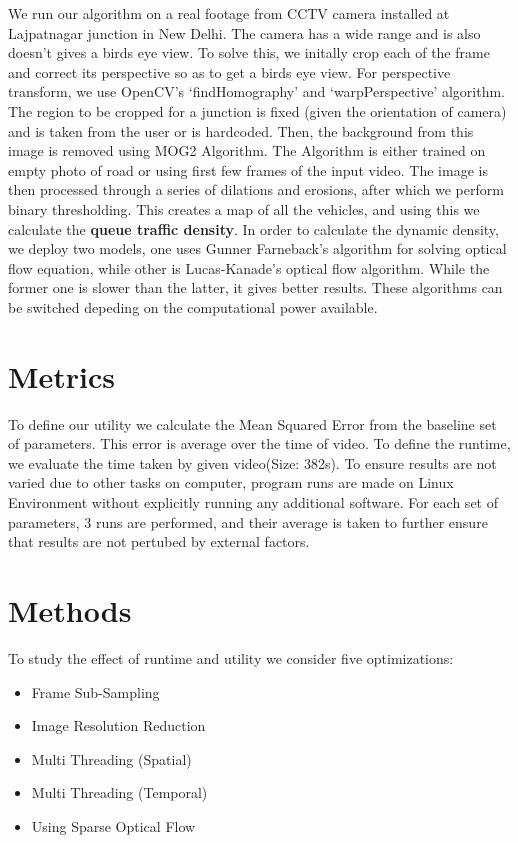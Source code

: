 \documentclass[conference]{IEEEtran}
\begin{document}
We run our algorithm on a real footage from CCTV camera installed at Lajpatnagar junction in New Delhi. \cite{b1}
The camera has a wide range and is also doesn't gives a birds eye view. To solve this, we initally crop each of the frame and correct its perspective so as to get a birds eye view. 
For perspective transform, we use OpenCV's `findHomography' and `warpPerspective' algorithm. \cite{b2}
The region to be cropped for a junction is fixed (given the orientation of camera) and is taken from the user or is hardcoded.
Then, the background from this image is removed using MOG2 Algorithm. The Algorithm is either trained on empty photo of road or using first few frames of the input video.
The image is then processed through a series of dilations and erosions, after which we perform binary thresholding. This creates a map of all the vehicles, and using this we calculate the {\bfseries{queue traffic density}}. 
In order to calculate the dynamic density, we deploy two models, one uses Gunner Farneback's algorithm for solving optical flow equation, while other is Lucas-Kanade's optical flow algorithm. \cite{b4} \cite{b5}
While the former one is slower than the latter, it gives better results. These algorithms can be switched depeding on the computational power available.

\section{Metrics}

To define our utility we calculate the Mean Squared Error from the baseline set of parameters. This error is average over the time of video.
To define the runtime, we evaluate the time taken by given video(Size: 382s). To ensure results are not varied due to other tasks on computer, 
program runs are made on Linux Environment without explicitly running any additional software. For each set of parameters, 3 runs are performed, and their average is taken to further ensure that results are not pertubed by external factors.
\section{Methods}

To study the effect of runtime and utility we consider five optimizations:
\begin{itemize}
    \item Frame Sub-Sampling
    \item Image Resolution Reduction
    \item Multi Threading (Spatial)
    \item Multi Threading (Temporal)
    \item Using Sparse Optical Flow
\end{itemize}
\end{document}
